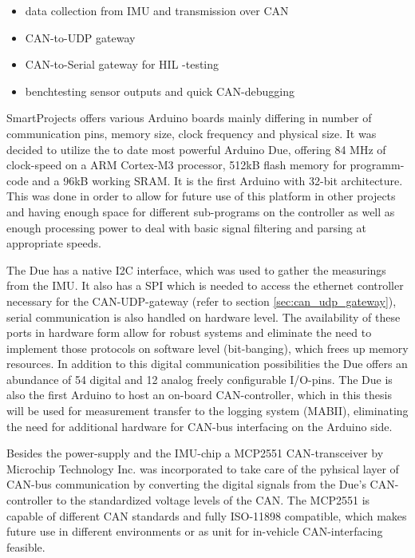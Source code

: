 \documentclass[ExampleMasters.tex]{subfiles}
\begin{document}
\begin{itemize}	
	\item data collection from \gls{IMU} and transmission over CAN
	\item CAN-to-UDP gateway
	\item CAN-to-Serial gateway for \gls{HIL} -testing
	\item benchtesting sensor outputs and quick CAN-debugging
\end{itemize}

SmartProjects offers various Arduino boards mainly differing in number of communication pins, memory size, clock frequency and physical size. It was decided to utilize the to date most powerful Arduino Due, offering 84 MHz of clock-speed on a ARM Cortex-M3 processor, 512kB flash memory for programm-code and a 96kB working SRAM. It is the first Arduino with 32-bit architecture. This was done in order to allow for future use of this platform in other projects and having enough space for different sub-programs on the controller as well as enough processing power to deal with basic signal filtering and parsing at appropriate speeds. 

The Due has a native \gls{I2C} interface, which was used to gather the measurings from the \gls{IMU}. It also has a \gls{SPI} which is needed to access the ethernet controller necessary for the \gls{CAN}-\Gls{UDP}-gateway (refer to section \ref{sec:can_udp_gateway}), serial communication is also handled on hardware level. The availability of these ports in hardware form allow for robust systems and eliminate the need to implement those protocols on software level (bit-banging), which frees up memory resources. In addition to this digital communication possibilities the Due offers an abundance of 54 digital and 12 analog freely configurable I/O-pins. The Due is also the first Arduino to host an on-board \gls{CAN}-controller, which in this thesis will be used for measurement transfer to the logging system (\gls{MABII}), eliminating the need for additional hardware for \gls{CAN}-bus interfacing on the Arduino side.

Besides the power-supply and the \gls{IMU}-chip a MCP2551 CAN-transceiver by Microchip Technology Inc. was incorporated to take care of the pyhsical layer of CAN-bus communication by converting the digital signals from the Due's CAN-controller to the standardized voltage levels of the \gls{CAN}. The MCP2551 is capable of different \gls{CAN} standards and fully ISO-11898 compatible, which makes future use in different environments or as unit for in-vehicle CAN-interfacing feasible.
\end{document}
